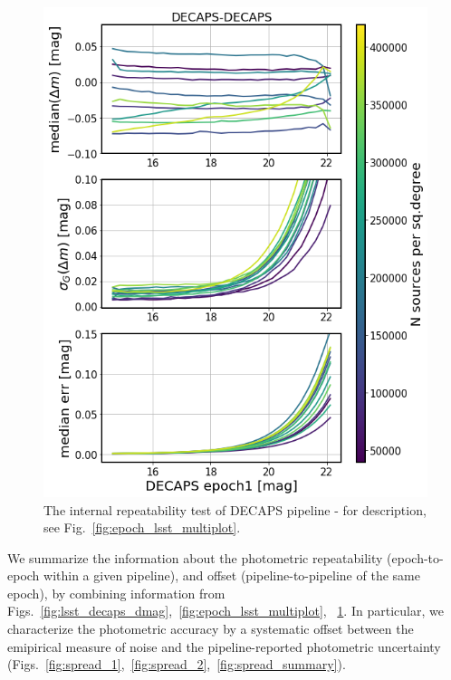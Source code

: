 \documentclass[DM,lsstdraft,toc,usenatbib]{lsstdoc}
\begin{document}
\begin{figure}
\begin{centering}
\includegraphics[width=0.8\columnwidth]{figs/decaps-decaps_rms_plot.png}
\caption{The internal repeatability test of DECAPS pipeline - for description, see Fig.~\ref{fig:epoch_lsst_multiplot}.}
\label{fig:epoch_decaps_multiplot}
\end{centering}
\end{figure} 

We summarize the information about the photometric repeatability (epoch-to-epoch within a given pipeline), and offset (pipeline-to-pipeline of the same epoch), by combining information from  Figs.~\ref{fig:lsst_decaps_dmag},~\ref{fig:epoch_lsst_multiplot}, ~\ref{fig:epoch_decaps_multiplot}. In particular, we characterize the photometric accuracy by a systematic offset between the emipirical measure of noise and the pipeline-reported photometric uncertainty (Figs.~\ref{fig:spread_1},~\ref{fig:spread_2},~\ref{fig:spread_summary}).
\end{document}
